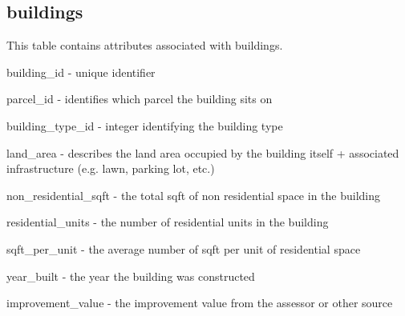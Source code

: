 \subsection{buildings} 

This table contains attributes associated with buildings.

\begin{description}
\item building\_id - unique identifier
\item parcel\_id - identifies which parcel the building sits on
\item building\_type\_id - integer identifying the building type
\item land\_area - describes the land area occupied by the building itself + associated infrastructure (e.g. lawn, parking lot, etc.)
\item non\_residential\_sqft - the total sqft of non residential space in the building
\item residential\_units - the number of residential units in the building
\item sqft\_per\_unit - the average number of sqft per unit of residential space
\item year\_built - the year the building was constructed
\item improvement\_value - the improvement value from the assessor or other source 
\end{description}

